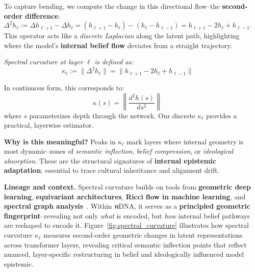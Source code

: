 \vspace{0.5em}

\noindent
To capture bending, we compute the change in this directional flow--the \textbf{second-order difference}:
\[
\Delta^2 h_\ell := \Delta h_{\ell+1} - \Delta h_\ell = (h_{\ell+1} - h_\ell) - (h_\ell - h_{\ell-1}) = h_{\ell+1} - 2 h_\ell + h_{\ell-1}.
\]
This operator acts like a \emph{discrete Laplacian} along the latent path, highlighting where the model’s \textbf{internal belief flow} deviates from a straight trajectory.

\vspace{0.5em}

\begin{tcolorbox}[
  colback=gray!5!white,
  colframe=black!75!white,
  boxrule=0.5pt,
  arc=2pt
]
\centering
\emph{Spectral curvature at layer $\ell$ is defined as:}
\[
\kappa_\ell := \big\| \Delta^2 h_\ell \big\| = \big\| h_{\ell+1} - 2 h_\ell + h_{\ell-1} \big\|
\]
\end{tcolorbox}

\vspace{0.5em}

\noindent
In continuous form, this corresponds to:
\[
\kappa(s) = \left\| \frac{d^2 h(s)}{ds^2} \right\|
\]
where $s$ parameterizes depth through the network. Our discrete $\kappa_\ell$ provides a practical, layerwise estimator.

\vspace{0.8em}


\noindent
\textbf{Why is this meaningful?}  
Peaks in $\kappa_\ell$ mark layers where internal geometry is most dynamic--zones of \emph{semantic inflection}, \emph{belief compression}, or \emph{ideological absorption}. These are the structural signatures of \textbf{internal epistemic adaptation}, essential to trace cultural inheritance and alignment drift.

\vspace{0.3em}

\noindent
\textbf{Lineage and context.}  
Spectral curvature builds on tools from \textbf{geometric deep learning}, \textbf{equivariant architectures}, \textbf{Ricci flow in machine learning}, and \textbf{spectral graph analysis}~\citep{farzam2024ricci, cho2023mixedcurvature, gasteiger2021gemnet, xu2022spherical, konf2021hierarchical, ying2021equivariant, hu2022lie, hess2023spectral, wang2021geomtransformer, raposo2023spectral}. Within \textbf{\textit{n}}\textnormal{DNA}, it serves as a \textbf{principled geometric fingerprint}--revealing not only \emph{what} is encoded, but \emph{how} internal belief pathways are reshaped to encode it. Figure~\ref{fig:spectral_curvature} illustrates how spectral curvature \(\kappa_\ell\) measures second-order geometric changes in latent representations across transformer layers, revealing critical semantic inflection points that reflect nuanced, layer-specific restructuring in belief and ideologically influenced model epistemic.


